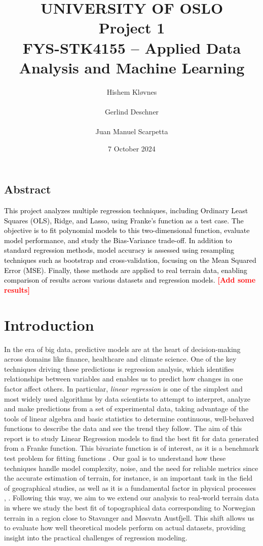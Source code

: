\documentclass[11pt, letterpaper, titlepage]{article}
\title{
 \textbf{\LARGE UNIVERSITY OF OSLO} \\
\vspace{37mm}
\textbf{\Large Project 1}\\
\vspace{7mm}
\Large FYS-STK4155 – Applied Data Analysis and Machine Learning
\vspace{25mm}
}
\author{\Large Hishem Kløvnes \\ \\
        \Large Gerlind Deschner\\ \\
        \Large Juan Manuel Scarpetta
        \vspace{45mm}
        }
\date{\Large 7 October 2024} %
\begin{document}
\maketitle
\tableofcontents
\newpage

\begin{center}
  \subsection*{Abstract}  
\end{center}
\textcolor{black}{This project analyzes multiple regression techniques, including Ordinary Least Squares (OLS), Ridge, and Lasso, using Franke's function as a test case. The objective is to fit polynomial models to this two-dimensional function, evaluate model performance, and study the Bias-Variance trade-off. In addition to standard regression methods, model accuracy is assessed using resampling techniques such as bootstrap and cross-validation, focusing on the Mean Squared Error (MSE). Finally, these methods are applied to real terrain data, enabling comparison of results across various datasets and regression models. }\textcolor{red}{\textbf{[Add some results]}} 
\bigskip
\bigskip


\section{Introduction}
In the era of big data, predictive models are at the heart of decision-making across domains like finance, healthcare and climate science. One of the key techniques driving these predictions is regression analysis, which identifies relationships between variables and enables us to
predict how changes in one factor affect others. In particular, \textit{linear regression} is one of the simplest and most widely used algorithms by data scientists to attempt to interpret, analyze and make predictions from a set of experimental data, taking advantage of the tools of linear algebra and basic statistics to determine continuous, well-behaved functions to describe the data and see the trend they follow. The aim of this report is to study Linear Regression models to find the best fit for data generated from a Franke function.
This bivariate function is of interest, as it is a benchmark test problem for fitting functions \cite[Section 1.2.0]{Franke1979ACC}. Our goal is to understand how these techniques handle model complexity, noise, and the need for reliable metrics since the accurate estimation of terrain, for instance, is an important task in the field of geographical studies, as well as it is a fundamental factor in physical processes \cite{XIONG2022104191}, \cite{URBAZAEV2022100067}. Following this way, we aim to we extend our analysis to
real-world terrain data in where we study  
the best fit of topographical data corresponding to Norwegian terrain in a region close to Stavanger and Møsvatn Austfjell. This shift allows us to evaluate how well theoretical models perform on actual datasets, providing insight into the practical challenges of regression modeling.\\
\end{document}
